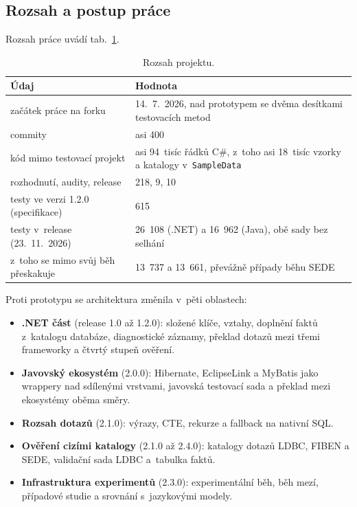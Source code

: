 \subsection{Rozsah a postup práce}\label{sec:postup}

Rozsah práce uvádí tab.~\ref{tab:cisla}.

\begin{table}[H]
\centering\footnotesize
\begin{tabular}{l l}
\toprule
\textbf{Údaj} & \textbf{Hodnota} \\
\midrule
začátek práce na forku & 14.~7.~2026, nad prototypem se dvěma desítkami testovacích metod \\
commity & asi 400 \\
kód mimo testovací projekt & asi 94~tisíc řádků C\#, z~toho asi 18~tisíc vzorky a katalogy v~\texttt{SampleData} \\
rozhodnutí, audity, release & 218, 9, 10 \\
testy ve verzi 1.2.0 (specifikace) & 615 \\
testy v~release \Vydani{} (23.~11.~2026) & 26~108 (.NET) a 16~962 (Java), obě sady bez selhání \\
z~toho se mimo svůj běh přeskakuje & 13~737 a 13~661, převážně případy běhu SEDE \\
\bottomrule
\end{tabular}
\caption{Rozsah projektu.}
\label{tab:cisla}
\end{table}

Proti prototypu se architektura změnila v~pěti oblastech:

\begin{itemize}[leftmargin=*,itemsep=1pt,beginpenalty=10000]
\item \textbf{.NET část} (release 1.0 až 1.2.0): složené klíče, vztahy, doplnění faktů z~katalogu databáze, diagnostické záznamy, překlad dotazů mezi třemi frameworky a čtvrtý stupeň ověření.
\item \textbf{Javovský ekosystém} (2.0.0): Hibernate, EclipseLink a MyBatis jako wrappery nad sdílenými vrstvami, javovská testovací sada a překlad mezi ekosystémy oběma směry.
\item \textbf{Rozsah dotazů} (2.1.0): výrazy, CTE, rekurze a fallback na nativní SQL.
\item \textbf{Ověření cizími katalogy} (2.1.0 až 2.4.0): katalogy dotazů LDBC, FIBEN a SEDE, validační sada LDBC a~tabulka faktů.
\item \textbf{Infrastruktura experimentů} (2.3.0): experimentální běh, běh mezí, případové studie a srovnání s~jazykovými modely.
\end{itemize}


